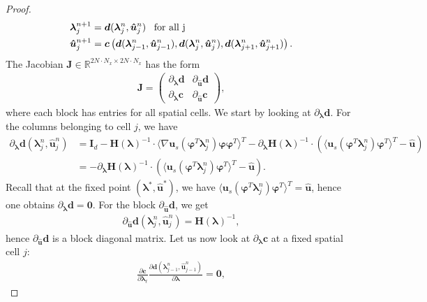 \begin{proof}
\begin{align*}
&\bm{\lambda}_j^{n+1} = \bm{d}(\bm{\lambda}_j^{n},\bm{\hat u}_j^{n}) \enskip \text{ for all j} \\
&\bm{\hat u}_j^{n+1} =  \bm{c}\left(\bm{d}(\bm{\lambda}_{j-1}^{n},\bm{\hat u}_{j-1}^{n}),\bm{d}(\bm{\lambda}_{j}^{n},\bm{\hat u}_{j}^{n}),\bm{d}(\bm{\lambda}_{j+1}^{n},\bm{\hat u}_{j+1}^{n})\right).
\end{align*}
The Jacobian $\bm{J}\in\mathbb{R}^{2N\cdot N_x \times 2N\cdot N_x}$ has the form
\begin{align}\label{eq:Jacobian}
\bm{J} = 
\begin{pmatrix}
 \partial_{\bm{\lambda}} \bm{d} & \partial_{\bm{\hat u}} \bm{d}  \\
\partial_{\bm{\lambda}} \bm{c} & \partial_{\bm{\hat u}} \bm{c}
\end{pmatrix},
\end{align}
where each block has entries for all spatial cells. We start by looking at $\partial_{\bm{\lambda}} \bm{d}$. For the columns belonging to cell $j$, we have
\begin{align*}
\partial_{\bm{\lambda}} \bm{d}(\bm{\lambda}_j^n,\bm{\hat u}_j^n) &= \bm{I}_d - \bm{H}(\bm\lambda)^{-1} \cdot \langle \nabla\bm{u}_s(\bm{\varphi}^T\bm{\lambda}_j^n)\bm{\varphi}\bm{\varphi}^T \rangle^T - \partial_{\bm{\lambda}}\bm{H}(\bm\lambda)^{-1} \cdot \left( \langle \bm{u}_s(\bm{\varphi}^T\bm{\lambda}_j^n)\bm{\varphi}^T \rangle^T - \bm{\hat u}\right) \\
&=- \partial_{\bm{\lambda}}\bm{H}(\bm\lambda)^{-1} \cdot \left( \langle \bm{u}_s(\bm{\varphi}^T\bm{\lambda}_j^n)\bm{\varphi}^T \rangle^T - \bm{\hat u}\right).
\end{align*}
Recall that at the fixed point $(\bm{\lambda}^*,\bm{\hat u}^*)$, we have $\langle \bm{u}_s(\bm{\varphi}^T\bm{\lambda}_j^n)\bm{\varphi}^T \rangle^T = \bm{\hat u}$, hence one obtains $\partial_{\bm{\lambda}} \bm{d}=\bm{0}$. For the block $\partial_{\bm{\hat u}} \bm{d}$, we get 
\begin{align*}
\partial_{\bm{\hat u}} \bm{d}(\bm{\lambda}_j^n,\bm{\hat u}_j^n) = \bm{H}(\bm\lambda)^{-1},
\end{align*}
hence $\partial_{\bm{\hat u}} \bm{d}$ is a block diagonal matrix. Let us now look at $\partial_{\bm{\lambda}} \bm{c}$ at a fixed spatial cell $j$:
\begin{align*}
\frac{\partial \bm{c}}{\partial \bm{\lambda}_{\ell}}\frac{\partial \bm{d}(\bm{\lambda}_{j-1}^{n},\bm{\hat u}_{j-1}^{n})}{\partial \bm{\lambda}} = \bm{0},
\end{align*}

\end{proof}
